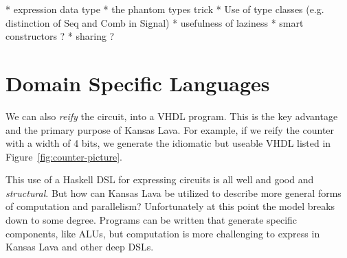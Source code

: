 \documentclass[11pt]{article}
\begin{document}
 * expression data type 
 * the phantom types trick 
 * Use of type classes (e.g. distinction of Seq and Comb in Signal) 
 * usefulness of laziness 
 * smart constructors ? 
 * sharing ?



\section{Domain Specific Languages}






We can also {\em reify\/} the circuit, into
a VHDL program. This is the key advantage and the
primary purpose of Kansas Lava. For example,
if we reify the counter with a width of 4 bits, we generate
the idiomatic but useable VHDL
listed in Figure~\ref{fig:counter-picture}.

This use of a Haskell DSL for expressing circuits
is all well and good and {\em structural\/}.
But how can Kansas Lava be utilized to
describe more general forms of computation and parallelism?
Unfortunately at this point the model breaks down
to some degree. Programs can be written
that generate specific components, like ALUs,
but computation is more challenging to express
in Kansas Lava and other deep DSLs.
\end{document}
